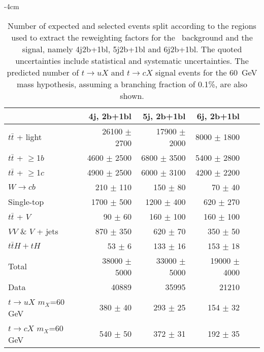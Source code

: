 \begin{table}[htb]
    \small
    \addtolength{\leftskip} {-4cm} %
    \addtolength{\rightskip}{-4cm}
    \centering
    \begin{tabular}{l r r r r r}
        \toprule\toprule
          & {4j, 2b+1bl} & {5j, 2b+1bl} & {6j, 2b+1bl} \\
          \midrule 
          $t\bar{t}$ + light        &  26100 $\pm$ 2700 & 17900 $\pm$ 2000 & 8000 $\pm$ 1800 \\ 
          $t\bar{t}$ + $\geq$1$b$   &  4600 $\pm$ 2500 & 6800 $\pm$ 3500 & 5400 $\pm$ 2800 \\ 
          $t\bar{t}$ + $\geq$1$c$   &  4900 $\pm$ 2500 & 6000 $\pm$ 3100 & 4200 $\pm$ 2200 \\ 
          $W\rightarrow cb$         &  210 $\pm$ 110 & 150 $\pm$ 80 & 70 $\pm$ 40   \\ 
          Single-top                &  1700  $\pm$ 500  & 1200  $\pm$ 400  & 620  $\pm$ 270  \\
          $t\bar{t}$ + $V$          &  90 $\pm$ 60 & 160 $\pm$ 100 & 160 $\pm$ 100    \\ 
          $VV$ \& $V$ + jets        &  870   $\pm$ 350  & 620   $\pm$ 70   & 350  $\pm$ 50   \\ 
          $t\bar{t}H+tH$            &  53    $\pm$ 6    & 133   $\pm$ 16    & 153  $\pm$ 18    \\         
\midrule      
Total                     & 38000 $\pm$ 5000 & 33000 $\pm$ 5000 & 19000 $\pm$ 4000  \\
\midrule
Data                      & 40889 & 35995 & 21210          \\

\midrule  
$t\to uX$ $m_X$=60 GeV             &  380 $\pm$ 40 & 293 $\pm$ 25 & 154 $\pm$ 32   \\
$t\to cX$ $m_X$=60 GeV             &  540 $\pm$ 50 & 372 $\pm$ 31 & 192 $\pm$ 35  \\
\bottomrule\bottomrule                               
    \end{tabular}
    \caption{Number of expected and selected events split according to the regions used to extract the reweighting factors for the \ttbar\ background and the signal, namely 4j2b+1bl, 5j2b+1bl and 6j2b+1bl. The quoted uncertainties include statistical and systematic uncertainties. The predicted number of $t\to uX$ and $t\to cX$ signal events for the 60~GeV mass hypothesis, assuming a branching fraction of 0.1\%, are also shown.
    }
    \label{tqX:prefityields2b1bl}
\end{table}

